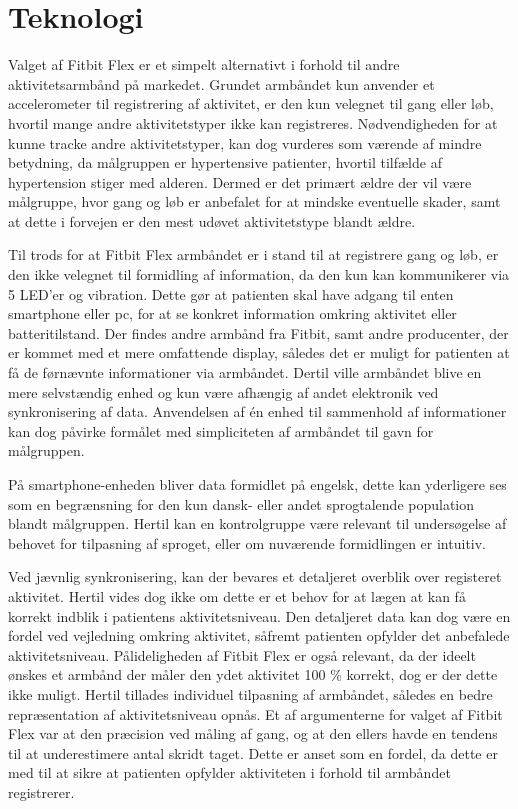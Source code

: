 \section{Teknologi} \label{sec:dis_teknologi}

Valget af Fitbit Flex er et simpelt alternativt i forhold til andre aktivitetsarmbånd på markedet. 
Grundet armbåndet kun anvender et accelerometer til registrering af aktivitet, er den kun velegnet til gang eller løb, hvortil mange andre aktivitetstyper ikke kan registreres. 
Nødvendigheden for at kunne tracke andre aktivitetstyper, kan dog vurderes som værende af mindre betydning, da målgruppen er hypertensive patienter, hvortil tilfælde af hypertension stiger med alderen. 
Dermed er det primært ældre der vil være målgruppe, hvor gang og løb er anbefalet for at mindske eventuelle skader, samt at dette i forvejen er den mest udøvet aktivitetstype blandt ældre. 

Til trods for at Fitbit Flex armbåndet er i stand til at registrere gang og løb, er den ikke velegnet til formidling af information, da den kun kan kommunikerer via 5 LED’er og vibration. 
Dette gør at patienten skal have adgang til enten smartphone eller pc, for at se konkret information omkring aktivitet eller batteritilstand. 
Der findes andre armbånd fra Fitbit, samt andre producenter, der er kommet med et mere omfattende display, således det er muligt for patienten at få de førnævnte informationer via armbåndet. 
Dertil ville armbåndet blive en mere selvstændig enhed og kun være afhængig af andet elektronik ved synkronisering af data. 
Anvendelsen af én enhed til sammenhold af informationer kan dog påvirke formålet med simpliciteten af armbåndet til gavn for målgruppen. 

På smartphone-enheden bliver data formidlet på engelsk, dette kan yderligere ses som en begrænsning for den kun dansk- eller andet sprogtalende population blandt målgruppen. 
Hertil kan en kontrolgruppe være relevant til undersøgelse af behovet for tilpasning af sproget, eller om nuværende formidlingen er intuitiv. 

Ved jævnlig synkronisering, kan der bevares et detaljeret overblik over registeret aktivitet. 
Hertil vides dog ikke om dette er et behov for at lægen at kan få korrekt indblik i patientens aktivitetsniveau. 
Den detaljeret data kan dog være en fordel ved vejledning omkring aktivitet, såfremt patienten opfylder det anbefalede aktivitetsniveau. 
Pålideligheden af Fitbit Flex er også relevant, da der ideelt ønskes et armbånd der måler den ydet aktivitet 100 \% korrekt, dog er der dette ikke muligt. 
Hertil tillades individuel tilpasning af armbåndet, således en bedre repræsentation af aktivitetsniveau opnås. 
Et af argumenterne for valget af Fitbit Flex var at den præcision ved måling af gang, og at den ellers havde en tendens til at underestimere antal skridt taget. 
Dette er anset som en fordel, da dette er med til at sikre at patienten opfylder aktiviteten i forhold til armbåndet registrerer. 


